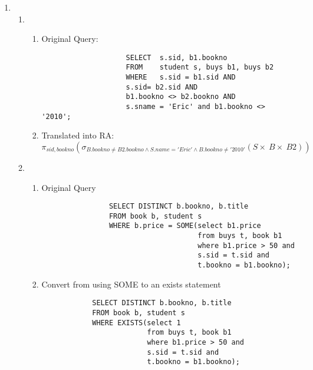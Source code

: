 \documentclass{article}
\begin{document}
\begin{enumerate}
    \item %
        \begin{enumerate}
        \item %
        \begin{enumerate}
                \item Original Query:
                \begin{lstlisting}
                    SELECT  s.sid, b1.bookno
                    FROM    student s, buys b1, buys b2
                    WHERE   s.sid = b1.sid AND
                    s.sid= b2.sid AND
                    b1.bookno <> b2.bookno AND
                    s.sname = 'Eric' and b1.bookno <> '2010';
                \end{lstlisting}

                \item Translated into RA:
                \begin{displaymath}
                    \pi_{sid, bookno}
                        (\sigma_{B.bookno \ne B2.bookno \wedge S.name='Eric' \wedge B.bookno \ne '2010'}
                            (S \times\ B \times\ B2))
                \end{displaymath}

        \end{enumerate}

        \item %
        \begin{enumerate}

            \item Original Query
            \begin{lstlisting}
                SELECT DISTINCT b.bookno, b.title
                FROM book b, student s
                WHERE b.price = SOME(select b1.price
                                     from buys t, book b1
                                     where b1.price > 50 and
                                     s.sid = t.sid and
                                     t.bookno = b1.bookno);
            \end{lstlisting}

            \item Convert from using SOME to an exists statement
            \begin{lstlisting}
            SELECT DISTINCT b.bookno, b.title
            FROM book b, student s
            WHERE EXISTS(select 1
                         from buys t, book b1
                         where b1.price > 50 and
                         s.sid = t.sid and
                         t.bookno = b1.bookno);
            \end{lstlisting}


\end{enumerate}
\end{enumerate}
\end{enumerate}
\end{document}
